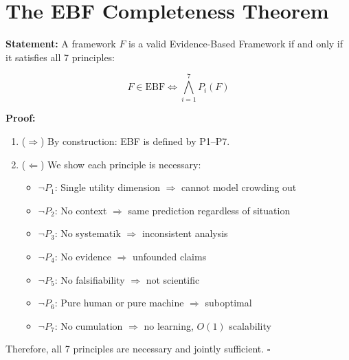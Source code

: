 \section{The EBF Completeness Theorem}
\label{sec:pr-completeness}

\begin{tcolorbox}[colback=blue!10!white, colframe=blue!75!black,
    title=\textbf{Theorem PR-1: EBF Completeness}]

\textbf{Statement:} A framework $F$ is a valid Evidence-Based Framework if and only if it satisfies all 7 principles:

\begin{equation}
F \in \text{EBF} \iff \bigwedge_{i=1}^{7} P_i(F)
\end{equation}

\textbf{Proof:}
\begin{enumerate}
    \item ($\Rightarrow$) By construction: EBF is defined by P1--P7.
    \item ($\Leftarrow$) We show each principle is necessary:
    \begin{itemize}[nosep]
        \item $\neg P_1$: Single utility dimension $\Rightarrow$ cannot model crowding out
        \item $\neg P_2$: No context $\Rightarrow$ same prediction regardless of situation
        \item $\neg P_3$: No systematik $\Rightarrow$ inconsistent analysis
        \item $\neg P_4$: No evidence $\Rightarrow$ unfounded claims
        \item $\neg P_5$: No falsifiability $\Rightarrow$ not scientific
        \item $\neg P_6$: Pure human or pure machine $\Rightarrow$ suboptimal
        \item $\neg P_7$: No cumulation $\Rightarrow$ no learning, $O(1)$ scalability
    \end{itemize}
\end{enumerate}

Therefore, all 7 principles are necessary and jointly sufficient. \hfill $\square$

\end{tcolorbox}


